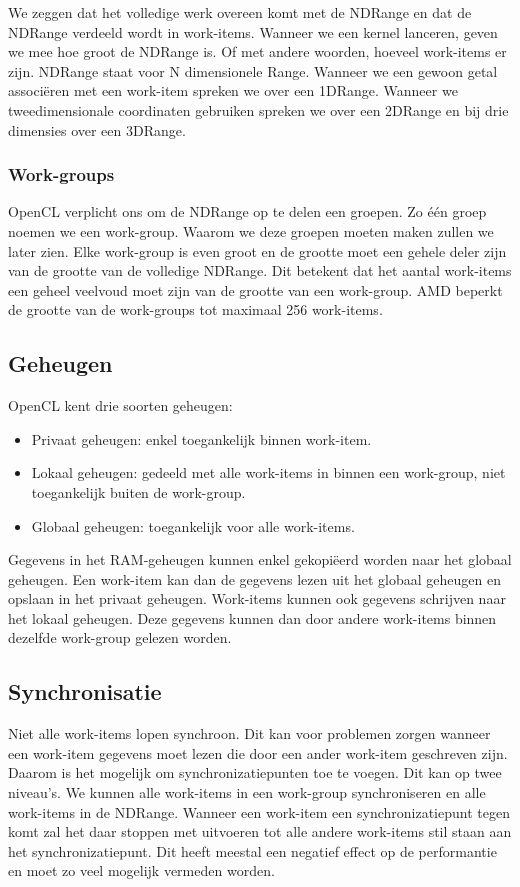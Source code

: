 We zeggen dat het volledige werk overeen komt met de NDRange en dat de NDRange verdeeld wordt in work-items. Wanneer we een kernel lanceren, geven we mee hoe groot de NDRange is. Of met andere woorden, hoeveel work-items er zijn. NDRange staat voor N dimensionele Range. Wanneer we een gewoon getal associ\"eren met een work-item spreken we over een 1DRange. Wanneer we tweedimensionale coordinaten gebruiken spreken we over een 2DRange en bij drie dimensies over een 3DRange. 

\subsubsection{Work-groups}
OpenCL verplicht ons om de NDRange op te delen een groepen. Zo \'e\'en groep noemen we een work-group. Waarom we deze groepen moeten maken zullen we later zien. Elke work-group is even groot en de grootte moet een gehele deler zijn van de grootte van de volledige NDRange. Dit betekent dat het aantal work-items een geheel veelvoud moet zijn van de grootte van een work-group. AMD beperkt de grootte van de work-groups tot maximaal 256 work-items.



\subsection{Geheugen}
\label{h:opencl:geheugen}
OpenCL kent drie soorten geheugen:
\begin{itemize}
    \item Privaat geheugen: enkel toegankelijk binnen work-item.
    \item Lokaal geheugen: gedeeld met alle work-items in binnen een work-group, niet toegankelijk buiten de work-group.
    \item Globaal geheugen: toegankelijk voor alle work-items.
\end{itemize}

Gegevens in het RAM-geheugen kunnen enkel gekopi\"eerd worden naar het globaal geheugen. Een work-item kan dan de gegevens lezen uit het globaal geheugen en opslaan in het privaat geheugen. Work-items kunnen ook gegevens schrijven naar het lokaal geheugen. Deze gegevens kunnen dan door andere work-items binnen dezelfde work-group gelezen worden. 

\subsection{Synchronisatie}
Niet alle work-items lopen synchroon. Dit kan voor problemen zorgen wanneer een work-item gegevens moet lezen die door een ander work-item geschreven zijn. Daarom is het mogelijk om synchronizatiepunten toe te voegen. Dit kan op twee niveau's. We kunnen alle work-items in een work-group synchroniseren en alle work-items in de NDRange. Wanneer een work-item een synchronizatiepunt tegen komt zal het daar stoppen met uitvoeren tot alle andere work-items stil staan aan het synchronizatiepunt. Dit heeft meestal een negatief effect op de performantie en moet zo veel mogelijk vermeden worden.

